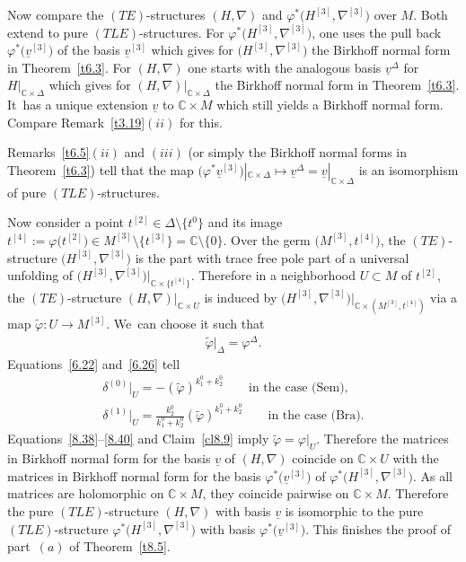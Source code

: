 \documentclass[pdftex]{sigma}%
\numberwithin{equation}{section}
\numberwithin{figure}{section}
\newcommand{\C}{{\mathbb C}}
\newcommand{\www}{\widetilde}
\newcommand{\uuuu}{\underline}
\newcommand{\nnn}{\nabla}
\begin{document}
Now compare the $(TE)$-structures $(H,\nnn)$ and
$\varphi^*\big(H^{[3]},\nnn^{[3]}\big)$ over $M$.
Both extend to pure $(TLE)$-structures.
For $\varphi^*\big(H^{[3]},\nnn^{[3]}\big)$, one uses the
pull back $\varphi^*\big(\uuuu{v}^{[3]}\big)$ of the basis
$\uuuu{v}^{[3]}$ which gives for $\big(H^{[3]},\nnn^{[3]}\big)$
the Birkhoff normal form in Theorem~\ref{t6.3}.
For $(H,\nnn)$ one starts with the analogous basis
$\uuuu{v}^\Delta$ for $H|_{\C\times\Delta}$ which gives
for $(H,\nnn)|_{\C\times\Delta}$ the Birkhoff normal form
in Theorem~\ref{t6.3}. It~has a unique extension $\uuuu{v}$ to
$\C\times M$ which still yields a Birkhoff normal form.
Compare Remark~\ref{t3.19}$(ii)$ for this.

Remarks~\ref{t6.5}$(ii)$ and $(iii)$ (or simply
the Birkhoff normal forms in Theorem~\ref{t6.3}) tell that
the map $\big(\varphi^*\uuuu{v}^{[3]}\big)|_{\C\times\Delta}
\mapsto \uuuu{v}^\Delta=\uuuu{v}|_{\C\times\Delta}$ is an
isomorphism of pure $(TLE)$-structures.

Now consider a point $t^{[2]}\in \Delta\setminus \big\{t^0\big\}$ and
its image $t^{[4]}:=\varphi\big(t^{[2]}\big)\in
M^{[3]}\setminus \big\{t^{[3]}\big\} =\C\setminus\{0\}$. Over the germ
$\big(M^{[3]},t^{[4]}\big)$, the $(TE)$-structure $\big(H^{[3]},\nnn^{[3]}\big)$
is the part with trace free pole part of a universal
unfolding of $\big(H^{[3]},\nnn^{[3]}\big)|_{\C\times\{t^{[4]}\}}$.
Therefore in a neighborhood $U\subset M$ of $t^{[2]}$,
the $(TE)$-structure $(H,\nnn)|_{\C\times U}$
is induced by
$\big(H^{[3]},\nnn^{[3]}\big)|_{\C\times(M^{[3]},t^{[4]})}$
via a map $\www\varphi\colon U\to M^{[3]}$.
We~can choose it such that
\begin{gather}\label{8.38}
\www\varphi|_\Delta=\varphi^\Delta.
\end{gather}
Equations~\eqref{6.22} and~\eqref{6.26} tell
\begin{gather}\label{8.39}
\delta^{(0)}|_U = -(\www\varphi)^{k_1^0+k_2^0}
\qquad\text{in the case (Sem)},
\\
\delta^{(1)}|_U =
\frac{k_2^0}{k_1^0+k_2^0}(\www\varphi)^{k_1^0+k_2^0}
\qquad\text{in the case (Bra)}.\label{8.40}
\end{gather}
Equations~\eqref{8.38}--\eqref{8.40} and Claim~\ref{cl8.9} imply
$\www\varphi=\varphi|_U$.
Therefore the matrices in Birkhoff normal form
for the basis $\uuuu{v}$ of $(H,\nnn)$ coincide
on $\C\times U$ with the matrices in Birkhoff normal form
for the basis $\varphi^*\big(\uuuu{v}^{[3]}\big)$ of
$\varphi^*\big(H^{[3]},\nnn^{[3]}\big)$.
As all matrices are holomorphic on $\C\times M$,
they coincide pairwise on $\C\times M$.
Therefore the pure $(TLE)$-structure $(H,\nnn)$
with basis $\uuuu{v}$ is isomorphic to the pure
$(TLE)$-structure $\varphi^*\big(H^{[3]},\nnn^{[3]}\big)$
with basis $\varphi^*\big(\uuuu{v}^{[3]}\big)$.
This finishes the proof of part~$(a)$ of Theorem~\ref{t8.5}.
\end{document}

